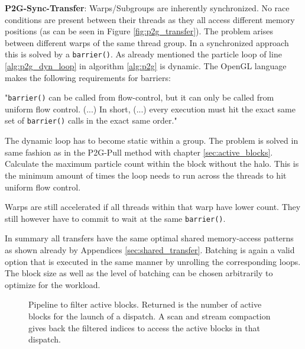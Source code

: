 \documentclass[m,times]{cgMA}
\begin{document}
\textbf{P2G-Sync-Transfer}: Warps/Subgroups are inherently synchronized. No race conditions are present between their threads as they all access different memory positions (as can be seen in Figure \ref{fig:p2g_transfer}). The problem arises between different warps of the same thread group. In a synchronized approach this is solved by a \texttt{barrier()}. As already mentioned the particle loop of line \ref{alg:p2g_dyn_loop} in algorithm \ref{alg:p2g} is dynamic.
The OpenGL language makes the following requirements for barriers:

"\texttt{barrier()} can be called from flow-control, but it can only be called from uniform flow control. (...) In short, (...) every execution must hit the exact same set of \texttt{barrier()} calls in the exact same order." \cite{KHRONOS:BARRIER}

The dynamic loop has to become static within a group. The problem is solved in same fashion as in the P2G-Pull method with chapter \ref{sec:active_blocks}. Calculate the maximum particle count within the block without the halo. This is the minimum amount of times the loop needs to run across the threads to hit uniform flow control.

Warps are still accelerated if all threads within that warp have lower count. They still however have to commit to wait at the same \texttt{barrier()}.

In summary all transfers have the same optimal shared memory-access patterns as shown already by Appendices \ref{sec:shared_transfer}. Batching is again a valid option that is executed in the same manner by unrolling the corresponding loops. The block size as well as the level of batching can be chosen arbitrarily to optimize for the workload.

\begin{figure}[!b]
  
  \caption{Pipeline to filter active blocks. Returned is the number of active blocks for the launch of a dispatch. A scan and stream compaction gives back the filtered indices to access the active blocks in that dispatch.}
  \label{fig:active_block}
\end{figure}
\end{document}
